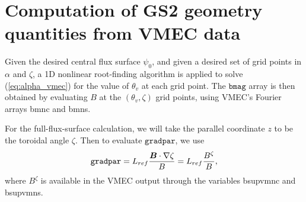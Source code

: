 \documentclass[11pt,letter]{article}
\newcommand{\vect}[1]{\mbox{\boldmath $#1$}}
\newcommand{\bmag}{\mathtt{bmag}}
\newcommand{\gradpar}{\mathtt{gradpar}}
\begin{document}
\section{Computation of GS2 geometry quantities from VMEC data} 


Given the desired central flux surface $\psi_0$, and given a desired set of grid points in $\alpha$ and $\zeta$, 
a 1D nonlinear root-finding algorithm is applied to solve (\ref{eq:alpha_vmec}) for the 
value of $\theta_v$ at each grid point. The $\bmag$ array is then obtained by evaluating $B$
at the $(\theta_v, \zeta)$ grid points, using VMEC's Fourier arrays {\ttfamily bmnc} and {\ttfamily bmns}.

For the full-flux-surface calculation, we will take the parallel coordinate $z$ to be the toroidal angle $\zeta$.
Then to evaluate $\gradpar$, we use
\begin{equation}
\gradpar = L_{ref} \frac{\vect{B}\cdot\nabla\zeta}{B} = L_{ref} \frac{B^\zeta}{B},
\end{equation}
where $B^\zeta$ is available in the VMEC output through the variables {\ttfamily bsupvmnc} and {\ttfamily bsupvmns}.
\end{document}
